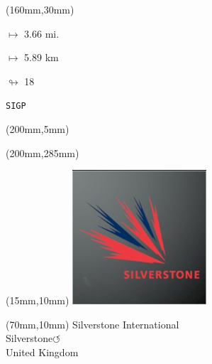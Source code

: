 \begin{textblock*}{40mm}(160mm,30mm)%
\Large
\par$\mapsto$ 3.66 mi.
\par$\mapsto$ 5.89 km
\par$\looparrowright$ 18
\par\hfill\tiny\tt SIGP\\
\end{textblock*}
\begin{textblock*}{20mm}(200mm,5mm)%
\fbox{\thepage}
\label{SIGP}
\end{textblock*}
\begin{textblock*}{20mm}(200mm,285mm)%
\fbox{\thepage}
\end{textblock*}

\null\newpage
\begin{textblock*}{50mm}(15mm,10mm)%
\includegraphics[width=50mm]{LG/2015-05-20_00094.png}
\end{textblock*}
\begin{textblock*}{130mm}(70mm,10mm)%
{\fontsize{20}{20}\selectfont Silverstone International\\}
{\fontsize{16}{16}\selectfont Silverstone\hfill \huge$\circlearrowleft$\\}
{\fontsize{12}{12}\selectfont United Kingdom\\}
\end{textblock*}
